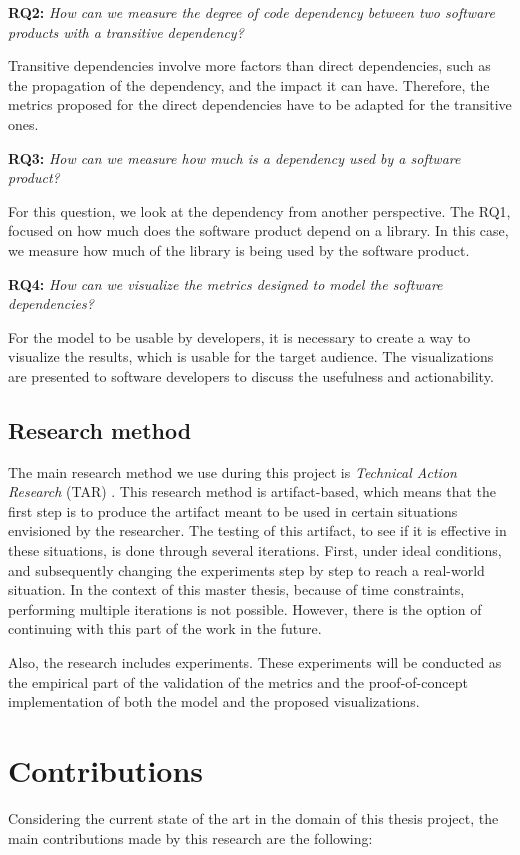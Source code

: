 \blankl
\textbf{RQ2:} \textit{How can we measure the degree of code dependency between two software products with a transitive dependency?}

\blankls
Transitive dependencies involve more factors than direct dependencies, such as the propagation of the dependency, and the impact it can have. Therefore, the metrics proposed for the direct dependencies have to be adapted for the transitive ones.

\blankl
\textbf{RQ3:} \textit{How can we measure how much is a dependency used by a software product?}

\blankls
For this question, we look at the dependency from another perspective. The RQ1, focused on how much does the software product depend on a library. In this case, we measure how much of the library is being used by the software product.

\blankl
\textbf{RQ4:} \textit{How can we visualize the metrics designed to model the software dependencies?}

\blankls
For the model to be usable by developers, it is necessary to create a way to visualize the results, which is usable for the target audience. The visualizations are presented to software developers to discuss the usefulness and actionability.

\subsection{Research method}
The main research method we use during this project is \textit{Technical Action Research} (TAR) \cite{wieringa2012technical}.
This research method is artifact-based, which means that the first step is to produce the artifact meant to be used in certain situations envisioned by the researcher. The testing of this artifact, to see if it is effective in these situations, is done through several iterations. First, under ideal conditions, and subsequently changing the experiments step by step to reach a real-world situation. In the context of this master thesis, because of time constraints, performing multiple iterations is not possible. However, there is the option of continuing with this part of the work in the future.

\blankl
Also, the research includes experiments. These experiments will be conducted as the empirical part of the validation of the metrics and the proof-of-concept implementation of both the model and the proposed visualizations.

\section{Contributions}
Considering the current state of the art in the domain of this thesis project, the main contributions made by this research are the following:

